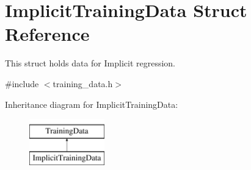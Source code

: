 \hypertarget{structImplicitTrainingData}{}\section{Implicit\+Training\+Data Struct Reference}
\label{structImplicitTrainingData}


This struct holds data for Implicit regression.  




{\ttfamily \#include $<$training\+\_\+data.\+h$>$}

Inheritance diagram for Implicit\+Training\+Data\+:\begin{figure}[H]
\begin{center}
\leavevmode
\includegraphics[height=2.000000cm]{structImplicitTrainingData}
\end{center}
\end{figure}
